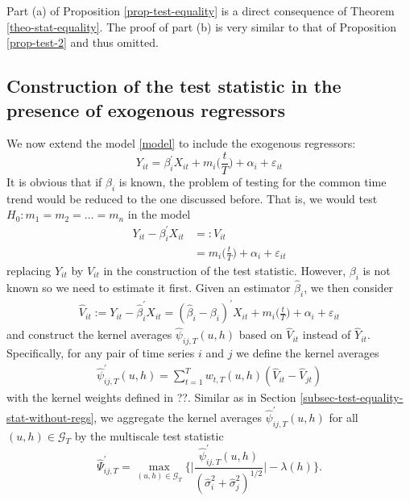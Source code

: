 Part (a) of Proposition \ref{prop-test-equality} is a direct consequence of Theorem \ref{theo-stat-equality}. The proof of part (b) is very similar to that of Proposition \ref{prop-test-2} and thus omitted. 

\subsection{Construction of the test statistic in the presence of exogenous regressors}\label{subsec-test-equality-stat-with-regs}

We now extend the model \eqref{model} to include the exogenous regressors:
\begin{equation}
Y_{it} = \beta_i^\prime X_{it} + m_i \Big( \frac{t}{T} \Big) + \alpha_i + \varepsilon_{it} 
\end{equation}
It is obvious that if $\beta_i$ is known, the problem of testing for the common time trend would be reduced to the one discussed before. That is, we would test $H_0: m_1 = m_2 = \ldots = m_n$ in the model
\begin{align*}
Y_{it} - \beta_i^\prime X_{it} & =: V_{it}\\
					& = m_i \Big( \frac{t}{T} \Big) + \alpha_i + \varepsilon_{it} 
\end{align*}
replacing $Y_{it}$ by $V_{it}$ in the construction of the test statistic. However, $\beta_i$ is not known so we need to estimate it first. Given an estimator $\widehat{\beta}_i$, we then consider
\begin{align*}
	\widehat{V}_{it} := Y_{it} - \widehat{\beta}_i^\prime X_{it} =(\widehat{\beta}_i - \beta_i)^\prime X_{it} + m_i \Big( \frac{t}{T} \Big) + \alpha_i + \varepsilon_{it} 
\end{align*}
and construct the kernel averages $\widehat{\psi}_{ij, T}(u, h)$ based on $\widehat{V}_{it}$ instead of $\widehat{Y}_{it}$. Specifically, for any pair of time series $i$ and $j$ we define the kernel averages
\begin{align*}
	\widehat{\psi}^{\prime}_{ij, T}(u, h) = \sum_{t=1}^T w_{t, T}(u, h)(\widehat{V}_{it} - \widehat{V}_{jt})
\end{align*}
with the kernel weights defined in ??. Similar as in Section \ref{subsec-test-equality-stat-without-regs}, we aggregate the kernel averages $\widehat{\psi}^{\prime}_{ij, T}(u, h)$ for all $(u, h)\in \mathcal{G}_T$ by the multiscale test statistic
\[ \widehat{\Psi}^\prime_{ij,T} = \max_{(u,h) \in \mathcal{G}_T} \Big\{ \Big|\frac{\widehat{\psi}^\prime_{ij,T}(u,h)}{(\widehat{\sigma}_i^2 + \widehat{\sigma}_j^2)^{1/2}}\Big| - \lambda(h) \Big\}. \]

